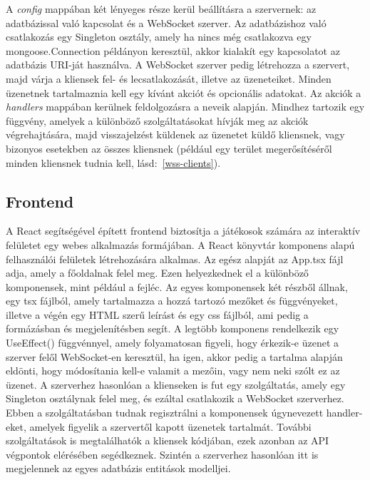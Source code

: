\documentclass[
]{thesis-ekf}
\theoremstyle{definition}
\theoremstyle{remark}
\begin{document}
A \emph{config} mappában két lényeges része kerül beállításra a szervernek: az adatbázissal való kapcsolat és a WebSocket szerver. Az adatbázishoz való csatlakozás egy Singleton osztály, amely ha nincs még csatlakozva egy mongoose.Connection példányon keresztül, akkor kialakít egy kapcsolatot az adatbázis URI-ját használva. A WebSocket szerver pedig létrehozza a szervert, majd várja a kliensek fel- és lecsatlakozását, illetve az üzeneteiket. Minden üzenetnek tartalmaznia kell egy kívánt akciót és opcionális adatokat. Az akciók a \emph{handlers} mappában kerülnek feldolgozásra a neveik alapján. Mindhez tartozik egy függvény, amelyek a különböző szolgáltatásokat hívják meg az akciók végrehajtására, majd visszajelzést küldenek az üzenetet küldő kliensnek, vagy bizonyos esetekben az összes kliensnek (például egy terület megerősítéséről minden kliensnek tudnia kell, lásd:~\ref{wss-clients}).

 

\subsection{Frontend}

A React segítségével épített frontend biztosítja a játékosok számára az interaktív felületet egy webes alkalmazás formájában. A React könyvtár komponens alapú felhasználói felületek létrehozására alkalmas. Az egész alapját az App.tsx fájl adja, amely a főoldalnak felel meg. Ezen helyezkednek el a különböző komponensek, mint például a fejléc. Az egyes komponensek két részből állnak, egy tsx fájlból, amely tartalmazza a hozzá tartozó mezőket és függvényeket, illetve a végén egy HTML szerű leírást és egy css fájlból, ami pedig a formázásban és megjelenítésben segít. A legtöbb komponens rendelkezik egy UseEffect() függvénnyel, amely folyamatosan figyeli, hogy érkezik-e üzenet a szerver felől WebSocket-en keresztül, ha igen, akkor pedig a tartalma alapján eldönti, hogy módosítania kell-e valamit a mezőin, vagy nem neki szólt ez az üzenet. A szerverhez hasonlóan a klienseken is fut egy szolgáltatás, amely egy Singleton osztálynak felel meg, és ezáltal csatlakozik a WebSocket szerverhez. Ebben a szolgáltatásban tudnak regisztrálni a komponensek úgynevezett handler-eket, amelyek figyelik a szervertől kapott üzenetek tartalmát. További szolgáltatások is megtalálhatók a kliensek kódjában, ezek azonban az API végpontok elérésében segédkeznek. Szintén a szerverhez hasonlóan itt is megjelennek az egyes adatbázis entitások modelljei. 
\end{document}
